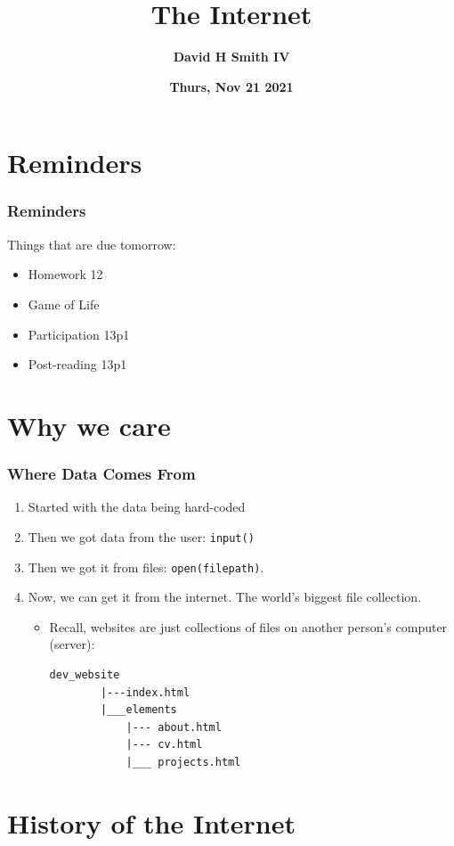 \documentclass{beamer}
\title{\textbf{The Internet}}
\author{\textbf{David H Smith IV}}
\institute[\textbf{UIUC}]{\textbf{University of Illinois Urbana-Champaign}}
\date{\textbf{Thurs, Nov 21 2021}}
\begin{document}
\frame{\titlepage}

\section{Reminders}

%
%
\begin{frame}
    \frametitle{Reminders}
    Things that are due tomorrow:
    \begin{itemize}
        \item Homework 12 
        \item Game of Life 
        \item Participation 13p1
        \item Post-reading 13p1
    \end{itemize}
\end{frame}

\section{Why we care}
%
%
\begin{frame}[fragile]
    \frametitle{Where Data Comes From}
    \begin{enumerate}
        \item Started with the data being hard-coded
        \item Then we got data from the user: \lstinline|input()|
            \pause
        \item Then we got it from files: \lstinline|open(filepath)|.
            \pause
        \item Now, we can get it from the internet. The world's biggest file collection.
            \begin{itemize}
                \item Recall, websites are just collections of files on another person's computer (server):
                    \begin{lstlisting}[autogobble]
        dev_website
        |---index.html
        |___elements
            |--- about.html
            |--- cv.html
            |___ projects.html
                    \end{lstlisting} 
            \end{itemize}
    \end{enumerate}
\end{frame}

\section{History of the Internet}
\end{document}
